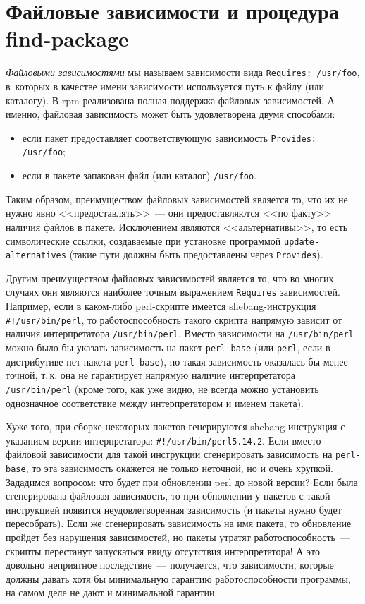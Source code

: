 \documentclass[russian,a4paper,12pt,titlepage]{article}
\begin{document}
\section{Файловые зависимости и процедура find-package}
\label{file-deps}\textit{Файловыми зависимостями} мы называем зависимости вида \verb|Requires: /usr/foo|,
в~которых в качестве имени зависимости используется путь к файлу (или каталогу).  В rpm реализована
полная поддержка файловых зависимостей.  А именно, файловая зависимость может быть удовлетворена двумя способами:
\begin{itemize}
\item если пакет предоставляет соответствующую зависимость \verb|Provides: /usr/foo|;
\item если в пакете запакован файл (или каталог) \verb|/usr/foo|.
\end{itemize}
Таким образом, преимуществом файловых зависимостей является то, что их не нужно явно <<предоставлять>>~---
они предоставляются <<по факту>> наличия файлов в пакете.  Исключением являются <<альтернативы>>, то есть
символические ссылки, создаваемые при установке программой \verb|update-alternatives| (такие пути должны
быть предоставлены через \verb|Provides|).

Другим преимуществом файловых зависимостей является то, что во многих случаях они являются наиболее точным
выражением \verb|Requires| зависимостей.  Например, если в каком-либо perl-скрипте имеется shebang-инструкция
\verb|#!/usr/bin/perl|, то работоспособность такого скрипта напрямую зависит от наличия интерпретатора \verb|/usr/bin/perl|.
Вместо зависимости на \verb|/usr/bin/perl| можно было бы указать зависимость на пакет \verb|perl-base| (или \verb|perl|,
если в дистрибутиве нет пакета \verb|perl-base|), но такая зависимость оказалась бы менее точной, т.\,к. она не гарантирует
напрямую наличие интерпретатора \verb|/usr/bin/perl| (кроме того, как уже видно, не всегда можно установить однозначное
соответствие между интерпретатором и именем пакета).

Хуже того, при сборке некоторых пакетов генерируются shebang-инструкция с указанием версии интерпретатора: \verb|#!/usr/bin/perl5.14.2|.
Если вместо файловой зависимости для такой инструкции сгенерировать зависимость на \verb|perl-base|, то эта зависимость
окажется не только неточной, но и очень хрупкой.  Зададимся вопросом: что будет при обновлении perl до новой версии?
Если была сгенерирована файловая зависимость, то при обновлении у пакетов с такой инструкцией появится неудовлетворенная
зависимость (и пакеты нужно будет пересобрать).  Если же сгенерировать зависимость на имя пакета, то обновление пройдет
без нарушения зависимостей, но пакеты утратят работоспособность~--- скрипты перестанут запускаться ввиду отсутствия
интерпретатора!  А это довольно неприятное последствие~--- получается, что зависимости, которые
должны давать хотя бы минимальную гарантию работоспособности программы, на самом деле не дают и минимальной гарантии.
\end{document}
